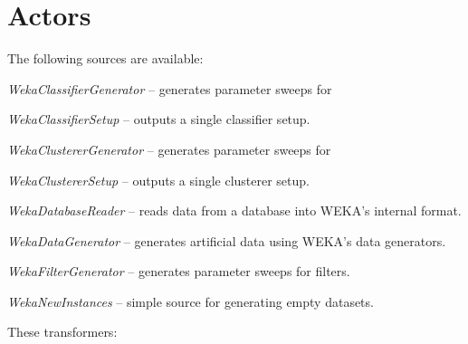 \section{Actors}
The following sources are available:
\begin{tight_itemize}
	\item \textit{WekaClassifierGenerator} -- generates parameter sweeps for
	\item \textit{WekaClassifierSetup} -- outputs a single classifier setup.
	\item \textit{WekaClustererGenerator} -- generates parameter sweeps for
	\item \textit{WekaClustererSetup} -- outputs a single clusterer setup.
	\item \textit{WekaDatabaseReader} -- reads data from a database into
	WEKA's internal format.
	\item \textit{WekaDataGenerator} -- generates artificial data using WEKA's
	data generators.
	\item \textit{WekaFilterGenerator} -- generates parameter sweeps for
	filters.
	\item \textit{WekaNewInstances} -- simple source for generating empty 
	datasets.
\end{tight_itemize}
These transformers:
